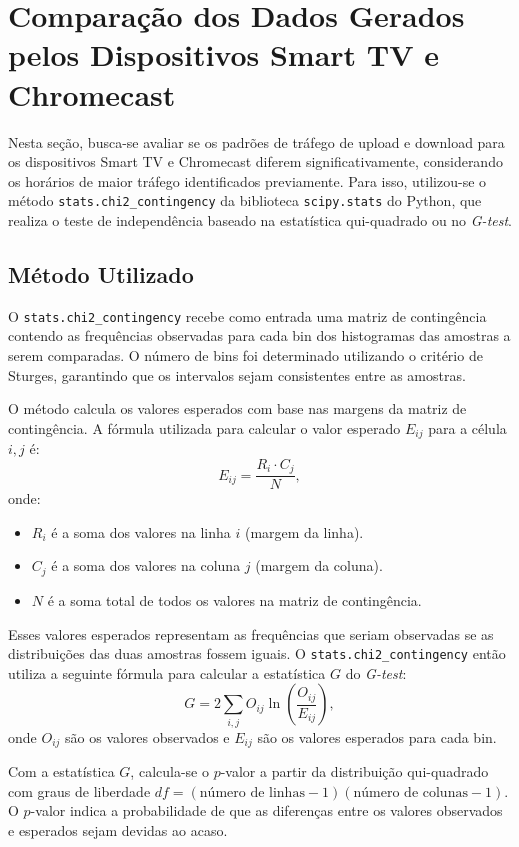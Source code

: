 \section{Comparação dos Dados Gerados pelos Dispositivos Smart TV e Chromecast}

Nesta seção, busca-se avaliar se os padrões de tráfego de upload e download para os dispositivos Smart TV e Chromecast diferem significativamente, considerando os horários de maior tráfego identificados previamente. Para isso, utilizou-se o método \texttt{stats.chi2\_contingency} da biblioteca \texttt{scipy.stats} do Python, que realiza o teste de independência baseado na estatística qui-quadrado ou no \textit{G-test}.

\subsection{Método Utilizado}

O \texttt{stats.chi2\_contingency} recebe como entrada uma matriz de contingência contendo as frequências observadas para cada bin dos histogramas das amostras a serem comparadas. O número de bins foi determinado utilizando o critério de Sturges, garantindo que os intervalos sejam consistentes entre as amostras.

O método calcula os valores esperados com base nas margens da matriz de contingência. A fórmula utilizada para calcular o valor esperado \(E_{ij}\) para a célula \(i, j\) é:
\[
E_{ij} = \frac{R_i \cdot C_j}{N},
\]
onde:
\begin{itemize}
    \item \(R_i\) é a soma dos valores na linha \(i\) (margem da linha).
    \item \(C_j\) é a soma dos valores na coluna \(j\) (margem da coluna).
    \item \(N\) é a soma total de todos os valores na matriz de contingência.
\end{itemize}

Esses valores esperados representam as frequências que seriam observadas se as distribuições das duas amostras fossem iguais. O \texttt{stats.chi2\_contingency} então utiliza a seguinte fórmula para calcular a estatística \(G\) do \textit{G-test}:
\[
G = 2 \sum_{i,j} O_{ij} \ln\left(\frac{O_{ij}}{E_{ij}}\right),
\]
onde \(O_{ij}\) são os valores observados e \(E_{ij}\) são os valores esperados para cada bin.

Com a estatística \(G\), calcula-se o \(p\)-valor a partir da distribuição qui-quadrado com graus de liberdade \(df = (\text{número de linhas} - 1)(\text{número de colunas} - 1)\). O \(p\)-valor indica a probabilidade de que as diferenças entre os valores observados e esperados sejam devidas ao acaso.

